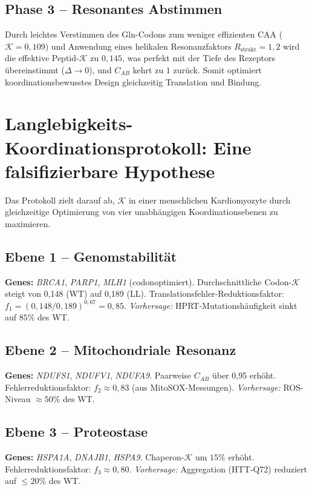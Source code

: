 \documentclass[12pt,a4paper]{article}
\newcommand{\REL}{\mathcal{K}}          %
\begin{document}
	\subsection{Phase 3 – Resonantes Abstimmen}
	Durch leichtes Verstimmen des Gln-Codons zum weniger effizienten CAA (\(\REL=0,109\)) und Anwendung eines helikalen Resonanzfaktors \(R_{\mathrm{strukt}}=1,2\) wird die effektive Peptid-\(\REL\) zu \(0,145\), was perfekt mit der Tiefe des Rezeptors übereinstimmt (\(\Delta \to 0\)), und \(C_{AB}\) kehrt zu \(1\) zurück. Somit optimiert koordinationsbewusstes Design gleichzeitig Translation und Bindung.
	
	\section{Langlebigkeits-Koordinationsprotokoll: Eine falsifizierbare Hypothese}
	\label{sec:LL}
	Das Protokoll zielt darauf ab, \(\REL\) in einer menschlichen Kardiomyozyte durch gleichzeitige Optimierung von vier unabhängigen Koordinationsebenen zu maximieren.
	
	\subsection{Ebene 1 – Genomstabilität}
	\textbf{Genes:} \emph{BRCA1}, \emph{PARP1}, \emph{MLH1} (codonoptimiert).  
	Durchschnittliche Codon-\(\REL\) steigt von 0,148 (WT) auf 0,189 (LL).  
	Translationsfehler-Reduktionsfaktor: \(f_1 = (0,148/0,189)^{0,67} = 0,85\).  
	\textit{Vorhersage:} HPRT-Mutationshäufigkeit sinkt auf \(85\%\) des WT.
	
	\subsection{Ebene 2 – Mitochondriale Resonanz}
	\textbf{Genes:} \emph{NDUFS1}, \emph{NDUFV1}, \emph{NDUFA9}. Paarweise \(C_{AB}\) über 0,95 erhöht.  
	Fehlerreduktionsfaktor: \(f_2 \approx 0,83\) (aus MitoSOX-Messungen).  
	\textit{Vorhersage:} ROS-Niveau \(\approx 50\%\) des WT.
	
	\subsection{Ebene 3 – Proteostase}
	\textbf{Genes:} \emph{HSPA1A}, \emph{DNAJB1}, \emph{HSPA9}. Chaperon-\(\REL\) um \(15\%\) erhöht.  
	Fehlerreduktionsfaktor: \(f_3 \approx 0,80\).  
	\textit{Vorhersage:} Aggregation (HTT‑Q72) reduziert auf \(\le 20\%\) des WT.
	
\end{document}
